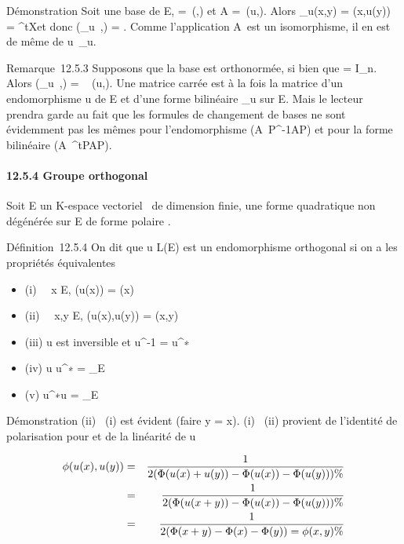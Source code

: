 \documentclass[]{article}
\begin{document}
Démonstration Soit  une base de E, \Omega =\
\mathrmMat (\phi,) et A =\
\mathrmMat (u,). Alors \psi_u(x,y) =
\phi(x,u(y)) = ^tX\OmegaAY et donc
\mathrmMat (\psi_u~,\mathcal{E})
= \OmegaA. Comme l'application A\mapsto~\OmegaA est un
isomorphisme, il en est de même de
u\mapsto~\psi_u.

Remarque~12.5.3 Supposons que la base  est orthonormée, si bien que \Omega =
I_n. Alors
\mathrmMat (\psi_u~,)
= \mathrmMat~ (u,\mathcal{E}). Une
matrice carrée est à la fois la matrice d'un endomorphisme u de E et
d'une forme bilinéaire \psi_u sur E. Mais le lecteur prendra garde
au fait que les formules de changement de bases ne sont évidemment pas
les mêmes pour l'endomorphisme
(A\mapsto~P^-1AP) et pour la forme
bilinéaire (A\mapsto~^tPAP).

\paragraph{12.5.4 Groupe orthogonal}

Soit E un K-espace vectoriel ~de dimension finie, \Phi une forme
quadratique non dégénérée sur E de forme polaire \phi.

Définition~12.5.4 On dit que u \in L(E) est un endomorphisme orthogonal si
on a les propriétés équivalentes

\begin{itemize}
\itemsep1pt\parskip0pt
\item
  (i) \forall~~x \in E, \Phi(u(x)) = \Phi(x)
\item
  (ii) \forall~~x,y \in E, \phi(u(x),u(y)) = \phi(x,y)
\item
  (iii) u est inversible et u^-1 = u^∗
\item
  (iv) u \cdot u^∗ = \mathrmId_E
\item
  (v) u^∗\cdot u = \mathrmId_E
\end{itemize}

Démonstration (ii) \rigtharrow~(i) est évident (faire y = x). (i) \rigtharrow~(ii) provient de
l'identité de polarisation pour \Phi et de la linéarité de u

\begin{align*} \phi(u(x),u(y))& =& 1
\over 2 (\Phi(u(x) + u(y)) - \Phi(u(x)) - \Phi(u(y)))\%&
\\ & =& 1 \over 2
(\Phi(u(x + y)) - \Phi(u(x)) - \Phi(u(y))) \%& \\
& =& 1 \over 2 (\Phi(x + y) - \Phi(x) - \Phi(y)) = \phi(x,y)
\%& \\ \end{align*}
\end{document}
